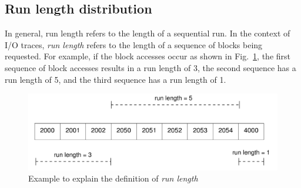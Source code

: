 

\subsection{Run length distribution}
In general, run length refers to the length of a sequential run. In the
context of I/O traces, \textit{run length} refers to the length of 
a sequence of blocks being requested. For example, if the block accesses
occur as shown in Fig.~\ref{fig:runlength-example}, the first sequence
of block accesses results in a run length of 3, the second sequence has
a run length of 5, and the third sequence has a run length of 1. 

\begin{figure}
	\centering
	\includegraphics[scale=0.55]{tracechar-figures/21-day/runlength-example.pdf}
	\caption{Example to explain the definition of \textit{run length}}
	\label{fig:runlength-example}
\end{figure}


